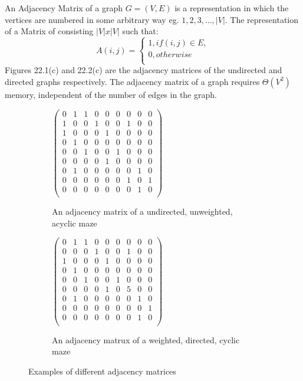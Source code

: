 \begin{definition}
An Adjacency Matrix of a graph $G=(V, E)$ is a representation in which the vertices are numbered in some arbitrary way eg. $1,2,3,\dots, |V|$. The representation of a Matrix of
consisting $|V|x|V|$ such that: 
$$A(i,j)=\begin{cases}
1, if (i,j)\in E,\\
0, otherwise\\
\end{cases}$$
Figures 22.1(c) and 22.2(c) are the adjacency matrices of the undirected and directed graphs respectively.
The adjacency matrix of a graph requires $\varTheta(V^2)$memory, independent of the number of edges in the graph.
\end{definition}
\begin{figure}
	\centering
	\begin{subfigure}{.5\textwidth}
	  \centering
	  $\begin{pmatrix}
		0&1&1&0&0&0&0&0&0\\
		1&0&0&1&0&0&1&0&0\\
		1&0&0&0&1&0&0&0&0\\
		0&1&0&0&0&0&0&0&0\\
		0&0&1&0&0&1&0&0&0\\
		0&0&0&0&1&0&0&0&0\\
		0&1&0&0&0&0&0&1&0\\
		0&0&0&0&0&0&1&0&1\\
		0&0&0&0&0&0&0&1&0\\
	\end{pmatrix}$
	  \caption{An adjacency matrix of a  undirected, unweighted, \\acyclic maze}
	  \label{fig:sub1}
	\end{subfigure}%
	\begin{subfigure}{.5\textwidth}
	  \centering
	  $\begin{pmatrix}
		0&1&1&0&0&0&0&0&0\\
		0&0&0&1&0&0&1&0&0\\
		1&0&0&0&1&0&0&0&0\\
		0&1&0&0&0&0&0&0&0\\
		0&0&1&0&0&1&0&0&0\\
		0&0&0&0&1&0&5&0&0\\
		0&1&0&0&0&0&0&1&0\\
		0&0&0&0&0&0&0&0&1\\
		0&0&0&0&0&0&0&1&0\\
	\end{pmatrix}$
	  \caption{An adjacency matrux of a weighted, directed, cyclic maze}
	  \label{fig:sub2}
	\end{subfigure}
	\caption{Examples of different adjacency matrices}
	\label{fig:test}
	\end{figure}
